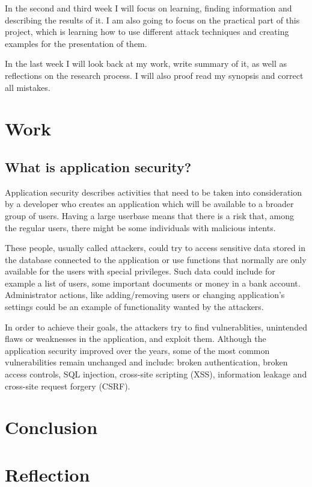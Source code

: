 \documentclass[a4paper]{article}
\begin{document}
In the second and third week I will focus on learning, finding information and describing the results of it. I am also going to focus on the practical part of this project, which is learning how to use different attack techniques and creating examples for the presentation of them.

In the last week I will look back at my work, write summary of it, as well as reflections on the research process. I will also proof read my synopsis and correct all mistakes.

\newpage

\section{Work}
\subsection{What is application security?}

Application security describes activities that need to be taken into consideration by a developer who creates an application which will be available to a broader group of users. Having a large userbase means that there is a risk that, among the regular users, there might be some individuals with malicious intents.

These people, usually called attackers, could try to access sensitive data stored in the database connected to the application or use functions that normally are only available for the users with special privileges. Such data could include for example a list of users, some important documents or money in a bank account. Administrator actions, like adding/removing users or changing application's settings could be an example of functionality wanted by the attackers.

In order to achieve their goals, the attackers try to find vulnerablities, unintended flaws or weaknesses in the application, and exploit them. Although the application security improved over the years, some of the most common vulnerabilities remain unchanged and include: broken authentication, broken access controls, SQL injection, cross-site scripting (XSS), information leakage and cross-site request forgery (CSRF).

\section{Conclusion}

\section{Reflection}
\end{document}
